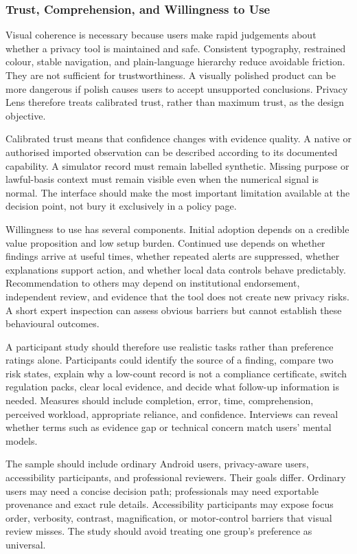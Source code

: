 \subsubsection{Trust, Comprehension, and Willingness to Use}

Visual coherence is necessary because users make rapid judgements about whether a privacy tool is maintained and safe. Consistent typography, restrained colour, stable navigation, and plain-language hierarchy reduce avoidable friction. They are not sufficient for trustworthiness. A visually polished product can be more dangerous if polish causes users to accept unsupported conclusions. Privacy Lens therefore treats calibrated trust, rather than maximum trust, as the design objective.

Calibrated trust means that confidence changes with evidence quality. A native or authorised imported observation can be described according to its documented capability. A simulator record must remain labelled synthetic. Missing purpose or lawful-basis context must remain visible even when the numerical signal is normal. The interface should make the most important limitation available at the decision point, not bury it exclusively in a policy page.

Willingness to use has several components. Initial adoption depends on a credible value proposition and low setup burden. Continued use depends on whether findings arrive at useful times, whether repeated alerts are suppressed, whether explanations support action, and whether local data controls behave predictably. Recommendation to others may depend on institutional endorsement, independent review, and evidence that the tool does not create new privacy risks. A short expert inspection can assess obvious barriers but cannot establish these behavioural outcomes.

A participant study should therefore use realistic tasks rather than preference ratings alone. Participants could identify the source of a finding, compare two risk states, explain why a low-count record is not a compliance certificate, switch regulation packs, clear local evidence, and decide what follow-up information is needed. Measures should include completion, error, time, comprehension, perceived workload, appropriate reliance, and confidence. Interviews can reveal whether terms such as evidence gap or technical concern match users' mental models.

The sample should include ordinary Android users, privacy-aware users, accessibility participants, and professional reviewers. Their goals differ. Ordinary users may need a concise decision path; professionals may need exportable provenance and exact rule details. Accessibility participants may expose focus order, verbosity, contrast, magnification, or motor-control barriers that visual review misses. The study should avoid treating one group's preference as universal.

